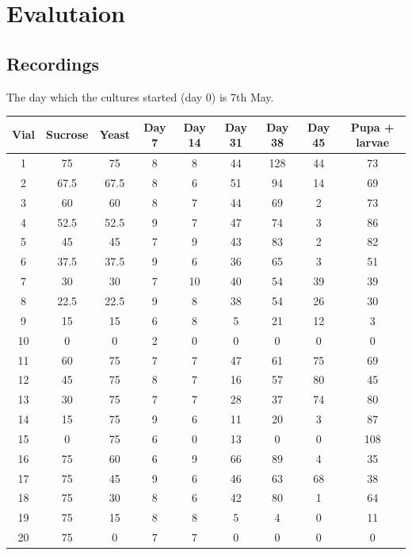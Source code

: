 \documentclass{article}
\begin{document}
\section{Evalutaion}

\subsection{Recordings}

The day which the cultures started (day 0) is 7th May.\\

{
\centering
\begin{tabular}{|c|c|c|c|c|c|c|c|c|}
  \hline
  Vial & Sucrose & Yeast & Day 7 & Day 14 & Day 31 & Day 38 & Day 45 & Pupa + larvae\\
  \hline
  \hline
  1 & 75 & 75 & 8 & 8 & 44 & 128 & 44 & 73\\
  2 & 67.5 & 67.5 & 8 & 6 & 51 & 94 & 14 & 69\\
  3 & 60 & 60 & 8 & 7 & 44 & 69 & 2 & 73\\
  4 & 52.5 & 52.5 & 9 & 7 & 47 & 74 & 3 & 86\\
  5 & 45 & 45 & 7 & 9 & 43 & 83 & 2 & 82\\
  6 & 37.5 & 37.5 & 9 & 6 & 36 & 65 & 3 & 51\\
  7 & 30 & 30 & 7 & 10 & 40 & 54 & 39 & 39\\
  8 & 22.5 & 22.5 & 9 & 8 & 38 & 54 & 26 & 30\\
  9 & 15 & 15 & 6 & 8 & 5 & 21 & 12 & 3\\
  10 & 0 & 0 & 2 & 0 & 0 & 0 & 0 & 0\\
  \hline
  11 & 60 & 75 & 7 & 7 & 47 & 61 & 75 & 69\\
  12 & 45 & 75 & 8 & 7 & 16 & 57 & 80 & 45\\
  13 & 30 & 75 & 7 & 7 & 28 & 37 & 74 & 80\\
  14 & 15 & 75 & 9 & 6 & 11 & 20 & 3 & 87\\
  15 & 0 & 75 & 6 & 0 & 13 & 0 & 0 & 108\\
  \hline
  16 & 75 & 60 & 6 & 9 & 66 & 89 & 4 & 35\\
  17 & 75 & 45 & 9 & 6 & 46 & 63 & 68 & 38\\
  18 & 75 & 30 & 8 & 6 & 42 & 80 & 1 & 64\\
  19 & 75 & 15 & 8 & 8 & 5 & 4 & 0 & 11\\
  20 & 75 & 0 & 7 & 7 & 0 & 0 & 0 & 0\\
  \hline
\end{tabular}
\par
}
\end{document}
